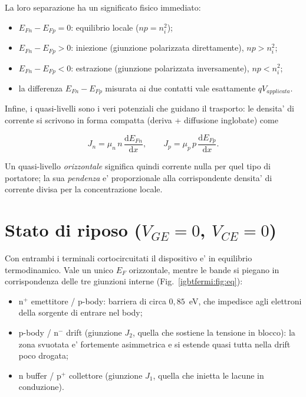 La loro separazione ha un significato fisico immediato:
\begin{itemize}[nosep,leftmargin=1.4em]
  \item $E_{Fn}-E_{Fp} = 0$: equilibrio locale ($np=n_i^2$);
  \item $E_{Fn}-E_{Fp} > 0$: iniezione (giunzione polarizzata direttamente),
        $np > n_i^2$;
  \item $E_{Fn}-E_{Fp} < 0$: estrazione (giunzione polarizzata inversamente),
        $np < n_i^2$;
  \item la differenza $E_{Fn}-E_{Fp}$ misurata ai due contatti vale
        esattamente $qV_{applicata}$.
\end{itemize}

Infine, i quasi-livelli sono i veri potenziali che guidano il trasporto: le
densita' di corrente si scrivono in forma compatta (deriva + diffusione
inglobate) come

\begin{equation}
J_n = \mu_n\, n\, \frac{\mathrm{d}E_{Fn}}{\mathrm{d}x},
\qquad
J_p = \mu_p\, p\, \frac{\mathrm{d}E_{Fp}}{\mathrm{d}x}.
\end{equation}

Un quasi-livello \emph{orizzontale} significa quindi corrente nulla per quel
tipo di portatore; la sua \emph{pendenza} e' proporzionale alla corrispondente
densita' di corrente divisa per la concentrazione locale.

\section{Stato di riposo (\texorpdfstring{$V_{GE}=0$, $V_{CE}=0$}{VGE=0, VCE=0})}

Con entrambi i terminali cortocircuitati il dispositivo e' in equilibrio
termodinamico. Vale un unico $E_F$ orizzontale, mentre le bande si piegano in
corrispondenza delle tre giunzioni interne (Fig.~\ref{igbtfermi:fig:eq}):

\begin{itemize}[nosep,leftmargin=1.4em]
  \item $\mathrm{n^{+}}$ emettitore / p-body: barriera di circa $0{,}85$~eV, che
        impedisce agli elettroni della sorgente di entrare nel body;
  \item p-body / $\mathrm{n^{-}}$ drift (giunzione $J_2$, quella che sostiene la
        tensione in blocco): la zona svuotata e' fortemente asimmetrica e si
        estende quasi tutta nella drift poco drogata;
  \item $\mathrm{n}$ buffer / $\mathrm{p^{+}}$ collettore (giunzione $J_1$,
        quella che inietta le lacune in conduzione).
\end{itemize}

